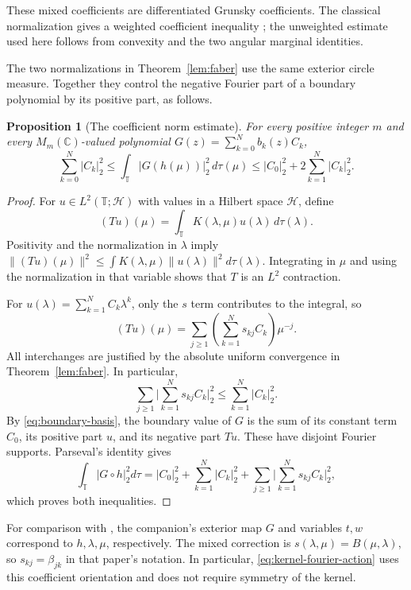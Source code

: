 \documentclass[11pt]{article}
\newcommand{\C}{\mathbb C}
\newcommand{\T}{\mathbb T}
\newcommand{\HS}[1]{\lvert #1\rvert_2}
\newtheorem{proposition}[theorem]{Proposition}
\theoremstyle{remark}\newtheorem{remark}[theorem]{Remark}
\numberwithin{equation}{section}
\begin{document}
These mixed coefficients are differentiated Grunsky coefficients.
The classical normalization gives a weighted coefficient inequality
\cite[equations~(1.1)--(1.3)]{BeckermannStylianopoulos2018};
the unweighted estimate used here follows from convexity and the two
angular marginal identities.

The two normalizations in Theorem~\ref{lem:faber} use the same exterior circle measure. Together they control the negative Fourier part of a boundary polynomial by its positive part, as follows.

\begin{proposition}[The coefficient norm estimate]\label{prop:coefficients}
For every positive integer $m$ and every $M_m(\C)$-valued polynomial $G(z)=\sum_{k=0}^N b_k(z)C_k$,
\begin{equation}\label{eq:coefficient-estimate}
 \sum_{k=0}^N\HS{C_k}^2
 \le\int_\T\HS{G(h(\mu))}^2\,d\tau(\mu)
 \le\HS{C_0}^2+2\sum_{k=1}^N\HS{C_k}^2.
\end{equation}
\end{proposition}
\begin{proof}
For $u\in L^2(\T;\mathcal H)$ with values in a Hilbert space $\mathcal H$, define
\[
 (Tu)(\mu)=\int_\T K(\lambda,\mu)u(\lambda)\,d\tau(\lambda).
\]
Positivity and the normalization in $\lambda$ imply
$\|(Tu)(\mu)\|^2\le\int K(\lambda,\mu)\|u(\lambda)\|^2d\tau(\lambda)$.
Integrating in $\mu$ and using the normalization in that variable shows that $T$ is an $L^2$ contraction.

For $u(\lambda)=\sum_{k=1}^N C_k\lambda^k$, only the $s$ term contributes to the integral, so
\begin{equation}\label{eq:kernel-fourier-action}
 (Tu)(\mu)=\sum_{j\ge1}\left(\sum_{k=1}^Ns_{kj}C_k\right)\mu^{-j}.
\end{equation}
All interchanges are justified by the absolute uniform convergence in Theorem~\ref{lem:faber}. In particular,
\[
 \sum_{j\ge1}\HS{\sum_{k=1}^Ns_{kj}C_k}^2\le\sum_{k=1}^N\HS{C_k}^2.
\]
By \eqref{eq:boundary-basis}, the boundary value of $G$ is the sum of its constant term $C_0$, its positive part $u$, and its negative part $Tu$. These have disjoint Fourier supports. Parseval's identity gives
\[
 \int_\T\HS{G\circ h}^2d\tau
 =\HS{C_0}^2+\sum_{k=1}^N\HS{C_k}^2+
   \sum_{j\ge1}\HS{\sum_{k=1}^Ns_{kj}C_k}^2,
\]
which proves both inequalities.
\end{proof}
For comparison with \cite[Proposition~3.1]{OpenAI2026Complete}, the
companion's exterior map $G$ and variables $t,w$ correspond to
$h,\lambda,\mu$, respectively.
The mixed correction is $s(\lambda,\mu)=B(\mu,\lambda)$, so
$s_{kj}=\beta_{jk}$ in that paper's notation. In particular,
\eqref{eq:kernel-fourier-action} uses this coefficient orientation and
does not require symmetry of the kernel.
\end{document}
